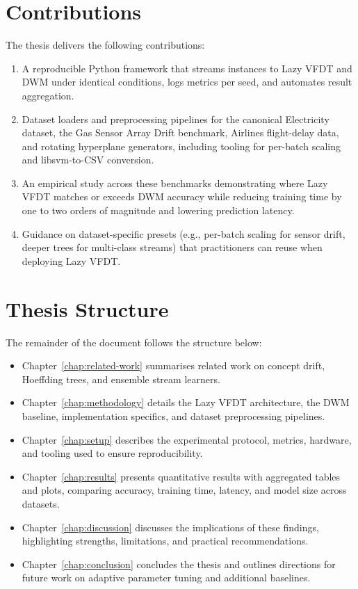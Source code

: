 \section{Contributions}
The thesis delivers the following contributions:
\begin{enumerate}
    \item A reproducible Python framework that streams instances to Lazy VFDT and DWM under identical conditions, logs metrics per seed, and automates result aggregation.
    \item Dataset loaders and preprocessing pipelines for the canonical Electricity dataset, the Gas Sensor Array Drift benchmark, Airlines flight-delay data, and rotating hyperplane generators, including tooling for per-batch scaling and libsvm-to-CSV conversion.
    \item An empirical study across these benchmarks demonstrating where Lazy VFDT matches or exceeds DWM accuracy while reducing training time by one to two orders of magnitude and lowering prediction latency.
    \item Guidance on dataset-specific presets (e.g., per-batch scaling for sensor drift, deeper trees for multi-class streams) that practitioners can reuse when deploying Lazy VFDT.
\end{enumerate}

\section{Thesis Structure}
The remainder of the document follows the structure below:
\begin{itemize}
    \item Chapter~\ref{chap:related-work} summarises related work on concept drift, Hoeffding trees, and ensemble stream learners.
    \item Chapter~\ref{chap:methodology} details the Lazy VFDT architecture, the DWM baseline, implementation specifics, and dataset preprocessing pipelines.
    \item Chapter~\ref{chap:setup} describes the experimental protocol, metrics, hardware, and tooling used to ensure reproducibility.
    \item Chapter~\ref{chap:results} presents quantitative results with aggregated tables and plots, comparing accuracy, training time, latency, and model size across datasets.
    \item Chapter~\ref{chap:discussion} discusses the implications of these findings, highlighting strengths, limitations, and practical recommendations.
    \item Chapter~\ref{chap:conclusion} concludes the thesis and outlines directions for future work on adaptive parameter tuning and additional baselines.
\end{itemize}
